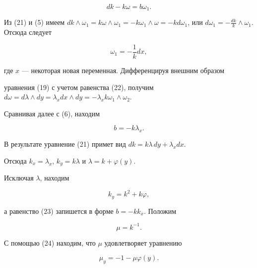 \begin{equation} 


d k-k\omega=b\omega_1. 


\end{equation} 


Из (21) и (5) имеем $d k\wedge\omega_1= k\omega\wedge\omega_1= 


-k\omega_1\wedge\omega= -k d\omega_1$, или $d\omega_1=-\frac{d 


k}{k}\wedge\omega_1$. Отсюда следует 


\begin{equation} 


\omega_1=-\frac{1}{k}dx, 


\end{equation} 


где $x$ --- некоторая новая переменная. Дифференцируя внешним образом 


уравнения (19) с учетом равенства (22), получим $d\omega=d\lambda\wedge 


dy=\lambda_x dx\wedge dy=-\lambda_x k\omega_1\wedge \omega_2$. 


Сравнивая далее с (6), находим 


\begin{equation} 


b=-k\lambda_x. 


\end{equation} 


В результате уравнение (21) примет вид $d k=k\lambda\,dy+\lambda_x dx$. 


Отсюда $k_x=\lambda_x$, $k_y=k\lambda$ и $\lambda=k+\varphi(y)$. 


Исключая $\lambda$, находим 


\begin{equation} 


k_y=k^2+k\varphi, 


\end{equation} 


а равенство (23) запишется в форме $b=-k k_x$. Положим 


\begin{equation} 


\mu=k^{-1}.


\end{equation} 


С помощью (24) находим, что $\mu$ удовлетворяет уравнению 


\begin{equation} 


\mu_y=-1-\mu\varphi(y). 


\end{equation} 


